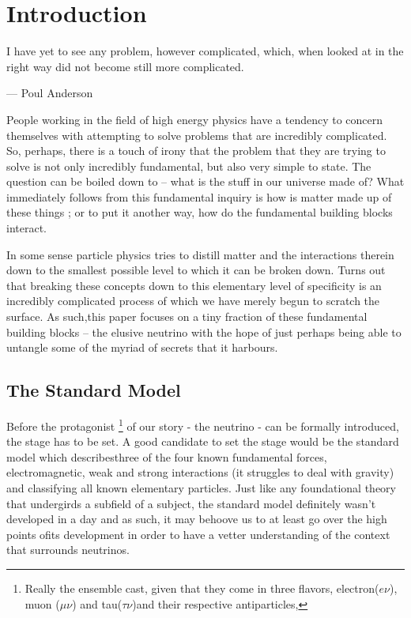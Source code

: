 \section{Introduction}

I have yet to see any problem, however complicated, which, when looked at in the right way did not become still more complicated.

\begin{flushright}--- Poul Anderson\end{flushright}

  People working in the field of high energy physics have a tendency to concern themselves with attempting to solve problems that are incredibly complicated.
  So, perhaps, there is a touch of irony that the problem that they are trying to solve is not only incredibly fundamental, but also very simple to state.
  The question can be boiled down to -- what is the stuff in our universe made of?
  What immediately follows from this fundamental inquiry is how is matter made up of these things ; or to put it another way, how do the fundamental building blocks interact.

  In some sense particle physics tries to distill matter and the interactions therein down to the smallest possible level to which it can be broken down.
  Turns out that breaking these concepts down to this elementary level of specificity is an incredibly complicated process of which we have merely begun to scratch the surface.
  As such,this paper focuses on a tiny fraction of these fundamental building blocks -- the elusive neutrino with the hope of just perhaps being able to untangle some of the myriad of secrets that it harbours.

  \subsection{The Standard Model}

  Before the protagonist
  \footnote{Really the ensemble cast, given that they come in three flavors, electron($e\nu$), muon ($\mu \nu$) and tau($\tau \nu$)and their respective antiparticles,}
  of our story - the neutrino - can be formally introduced, the stage has to be set.
  A good candidate to set the stage would be the standard model which describesthree of the four known fundamental forces, electromagnetic, weak and strong interactions (it struggles to deal with  gravity) and classifying all known elementary particles.
  Just like any foundational theory that undergirds a subfield of a subject, the standard model definitely wasn't developed in a day and as such, it may behoove us to at least go over the high points ofits development in order to have a vetter understanding of the context that surrounds neutrinos.

